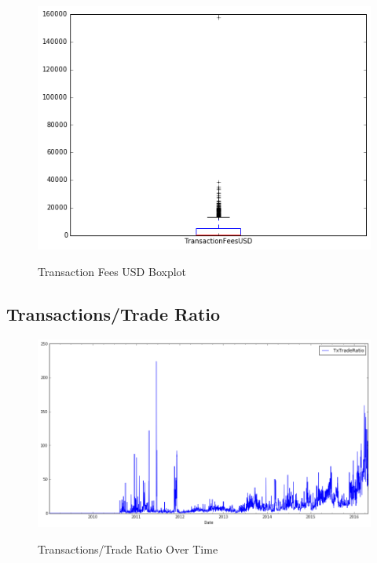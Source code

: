 \begin{figure}[bth]
  \myfloatalign
  {\includegraphics[width=1\linewidth]
    {gfx/transaction-fees-usd-boxplot}}
  \caption{Transaction Fees USD
    Boxplot}
  \label{fig:transaction-fees-usd-boxplot}
\end{figure}

\clearpage

\subsection{Transactions/Trade Ratio}
\label{sec:tx-trade-ratio}

\begin{figure}[bth]
  \myfloatalign
  {\includegraphics[width=1\linewidth]
    {gfx/tx-trade-ratio-over-time}}
  \caption{Transactions/Trade Ratio
    Over Time}
  \label{fig:tx-trade-ratio-over-time}
\end{figure}

